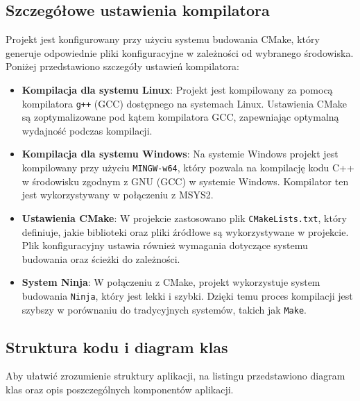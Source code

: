 \subsection{Szczegółowe ustawienia kompilatora}

Projekt jest konfigurowany przy użyciu systemu budowania CMake, który generuje odpowiednie pliki konfiguracyjne w zależności od wybranego środowiska. Poniżej przedstawiono szczegóły ustawień kompilatora:

\begin{itemize}
  \item \textbf{Kompilacja dla systemu Linux}: Projekt jest kompilowany za pomocą kompilatora \texttt{g++} (GCC) dostępnego na systemach Linux. Ustawienia CMake są zoptymalizowane pod kątem kompilatora GCC, zapewniając optymalną wydajność podczas kompilacji.
  \item \textbf{Kompilacja dla systemu Windows}: Na systemie Windows projekt jest kompilowany przy użyciu \texttt{MINGW-w64}, który pozwala na kompilację kodu C++ w środowisku zgodnym z GNU (GCC) w systemie Windows. Kompilator ten jest wykorzystywany w połączeniu z MSYS2.
  \item \textbf{Ustawienia CMake}: W projekcie zastosowano plik \texttt{CMakeLists.txt}, który definiuje, jakie biblioteki oraz pliki źródłowe są wykorzystywane w projekcie. Plik konfiguracyjny ustawia również wymagania dotyczące systemu budowania oraz ścieżki do zależności.
  \item \textbf{System Ninja}: W połączeniu z CMake, projekt wykorzystuje system budowania \texttt{Ninja}, który jest lekki i szybki. Dzięki temu proces kompilacji jest szybszy w porównaniu do tradycyjnych systemów, takich jak \texttt{Make}.
\end{itemize}

\subsection{Struktura kodu i diagram klas}

Aby ułatwić zrozumienie struktury aplikacji, na listingu  przedstawiono diagram klas oraz opis poszczególnych komponentów aplikacji.

